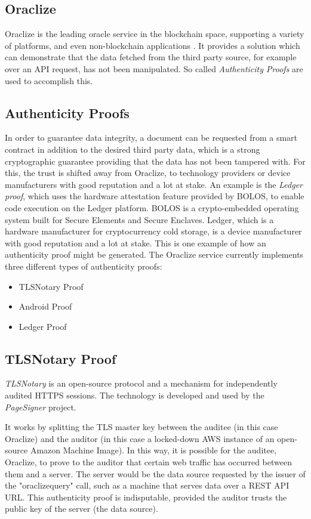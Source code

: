 \subsection{Oraclize}
Oraclize is the leading oracle service in the blockchain space, supporting a variety of platforms, and even non-blockchain applications \cite{oraclizedoc}. It provides a solution which can demonstrate that the data fetched from the third party source, for example over an API request, has not been manipulated. So called \emph{Authenticity Proofs} are used to accomplish this.
\subsection*{Authenticity Proofs}
In order to guarantee data integrity, a document can be requested from a smart contract in addition to the desired third party data, which is a strong cryptographic guarantee providing that the data has not been tampered with. For this, the trust is shifted away from Oraclize, to technology providers or device manufacturers with good reputation and a lot at stake. An example is the \emph{Ledger proof}, which uses the hardware attestation feature provided by BOLOS, to enable code execution on the Ledger platform. BOLOS is a crypto-embedded operating system built for Secure Elements and Secure Enclaves. Ledger, which is a hardware manufacturer for cryptocurrency cold storage, is a device manufacturer with good reputation and a lot at stake. This is one example of how an authenticity proof might be generated. The Oraclize service currently implements three different types of authenticity proofs:
\begin{itemize}
	\item TLSNotary Proof
	\item Android Proof
	\item Ledger Proof
\end{itemize}
\subsection*{TLSNotary Proof}
\emph{TLSNotary} is an open-source protocol and a mechanism for independently audited HTTPS sessions. The technology is developed and used by the \emph{PageSigner} project\cite{pagesigner}. 

It works by splitting the TLS master key between the auditee (in this case Oraclize) and the auditor (in this case a locked-down AWS instance of an open-source Amazon Machine Image). In this way, it is possible for the auditee, Oraclize, to prove to the auditor that certain web traffic has occurred between them and a server. The server would be the data source requested by the issuer of the "oraclize\textunderscore query" call, such as a machine that serves data over a REST API URL. This authenticity proof is indisputable, provided the auditor trusts the public key of the server (the data source).\cite{tlsnotarywhitepaper}\cite{oraclizedoc}

